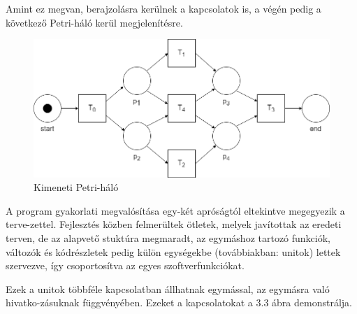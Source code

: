 \begin{example}
	Amint ez megvan, berajzolásra kerülnek a kapcsolatok is, a végén pedig a következő Petri-háló kerül megjelenítésre.
	\newpage

	\begin{figure}[h!]
	\begin{center}
	\includegraphics[width=\textwidth,keepaspectratio=true]{images/img_plan_2}
	\caption{Kimeneti Petri-háló}
	\label{fig:plan}
	\end{center}
	\end{figure}

\end{example}

\cite{procmining}

\lstset{style=delphicode}



A program gyakorlati megvalósítása egy-két apróságtól eltekintve megegyezik a terve\hyp{}zettel. Fejlesztés közben felmerültek ötletek, melyek javítottak az eredeti terven, de az alapvető stuktúra megmaradt, az egymáshoz tartozó funkciók, változók és kódrészletek pedig külön egységekbe (továbbiakban: unitok) lettek szervezve, így csoportosítva az egyes szoftverfunkciókat.

Ezek a unitok többféle kapcsolatban állhatnak egymással, az egymásra való hivatko\hyp{}zásuknak függvényében. Ezeket a kapcsolatokat a 3.3 ábra demonstrálja.

